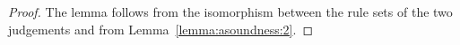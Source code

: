 \begin{proof}
The lemma follows from the isomorphism between the 
rule sets of the two judgements and from Lemma~\ref{lemma:asoundness:2}.
\end{proof}

{\centering
{}}

